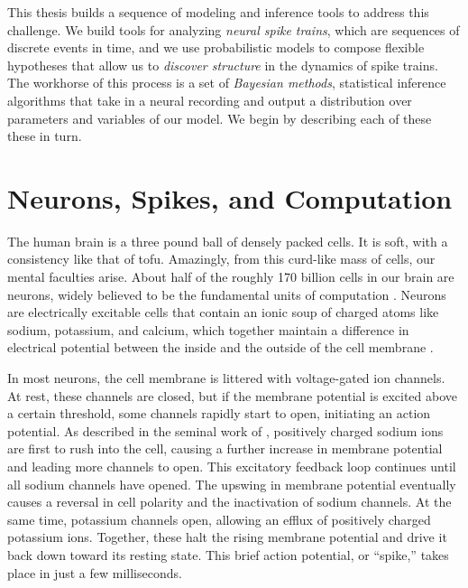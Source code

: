 This thesis builds a sequence of modeling and inference tools to
address this challenge. We build tools for analyzing \emph{neural spike
  trains}, which are sequences of discrete events in time, and we use
probabilistic models to compose flexible hypotheses that allow us to
\emph{discover structure} in the dynamics of spike trains.  The
workhorse of this process is a set of \emph{Bayesian methods},
statistical inference algorithms that take in a neural recording and
output a distribution over parameters and variables of our model.  We
begin by describing each of these these in turn.


\section{Neurons, Spikes, and Computation}
The human brain is a three pound ball of densely packed cells.  It is
soft, with a consistency like that of tofu.  Amazingly, from this
curd-like mass of cells, our mental faculties arise.  About half of
the roughly 170 billion cells in our brain are neurons, widely
believed to be the fundamental units of computation
\citep{DayanAbbott}.  Neurons are electrically excitable cells that
contain an ionic soup of charged atoms like sodium, potassium, and
calcium, which together maintain a difference in electrical potential
between the inside and the outside of the cell membrane
\citep{kandel2000principles}.

In most neurons, the cell membrane is littered with voltage-gated ion
channels. At rest, these channels are closed, but if the membrane
potential is excited above a certain threshold, some channels
rapidly start to open, initiating an action potential.
As described in the seminal work of \cite{hodgkin1952quantitative},
positively charged sodium ions are first to rush into the cell,
causing a further increase in membrane potential and leading more
channels to open. This excitatory feedback loop continues until all
sodium channels have opened.  The upswing in membrane potential
eventually causes a reversal in cell polarity and the inactivation of
sodium channels. At the same time, potassium channels open, allowing
an efflux of positively charged potassium ions. Together, these halt the rising membrane
potential and drive it back down toward its resting state.
This brief action potential, or ``spike,'' takes place in
just a few milliseconds.

